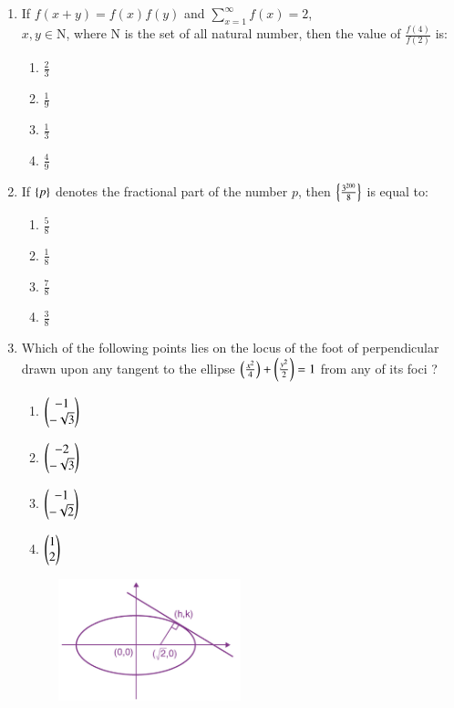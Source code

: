\documentclass[journal]{IEEEtran}
\theoremstyle{remark}
\begin{document}
\begin{enumerate}
\item  If $f(x + y) = f(x) f(y)$ and $\sum_{x=1}^{\infty} f(x) = 2$,\\
$x, y \in $N, where N is the set of all natural number, then the value of $\frac{f(4)}{f(2)}$ is:

\hfill{}

\begin{multicols}{4}
\begin{enumerate}
\item $\frac{2}{3}$
\item $\frac{1}{9}$
\item $\frac{1}{3}$
\item $\frac{4}{9}$
\end{enumerate}
\end{multicols}

\item  If $\left\{p\right\}$ denotes the fractional part of the number $p$, then $\left\{\frac{3^{200}}{8}\right\}$ is equal to:

\hfill{}
\begin{multicols}{4}
\begin{enumerate}
\item $\frac{5}{8}$
\item $\frac{1}{8}$
\item $\frac{7}{8}$
\item $\frac{3}{8}$
\end{enumerate}
\end{multicols}

\item  Which of the following points lies on the locus of the foot of perpendicular drawn upon any tangent to the ellipse $\left(\frac{x^2}{4}\right)+\left(\frac{y^2}{2}\right) = 1$ from any of its foci ?

\hfill{}


\begin{multicols}{4}
\begin{enumerate}
\item $\begin{pmatrix}-1 \\ -\sqrt{3}\end{pmatrix}$
\item $\begin{pmatrix}-2 \\ -\sqrt{3}\end{pmatrix}$
\item $\begin{pmatrix}-1 \\ -\sqrt{2}\end{pmatrix}$
\item $\begin{pmatrix}1 \\ 2\end{pmatrix}$
\end{enumerate}
\end{multicols}

\begin{figure}[h] 
    \centering
    \includegraphics[width=0.5\textwidth]{figure/15.png}
\end{figure}

\end{enumerate}
\end{document}
